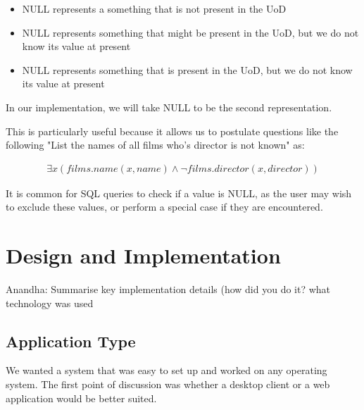 \documentclass[a4paper, 11pt]{article}
\begin{document}
    \begin{itemize}
      \item NULL represents a something that is not present in the UoD
      \item NULL represents something that might be present in the UoD, but
        we do not know its value at present
      \item NULL represents something that is present in the UoD, but we do
        not know its value at present
    \end{itemize}

    In our implementation, we will take NULL to be the second representation.

    This is particularly useful because it allows us to postulate questions like
    the following "List the names of all films who's director is not known" as:

    \begin{multline}
      \exists x(films.name(x,name) \land \lnot films.director(x, director) )
    \end{multline} 

    It is common for SQL queries to check if a value is NULL, as the user may
    wish to exclude these values, or perform a special case if they are
    encountered.

\section{Design and Implementation}
  Anandha: Summarise key implementation details (how did you do it? what technology was
  used


  \subsection{Application Type}
  We wanted a system that was easy to set up and worked on any operating system. The first point of discussion was whether a desktop client or a web application would be better suited.
\end{document}
